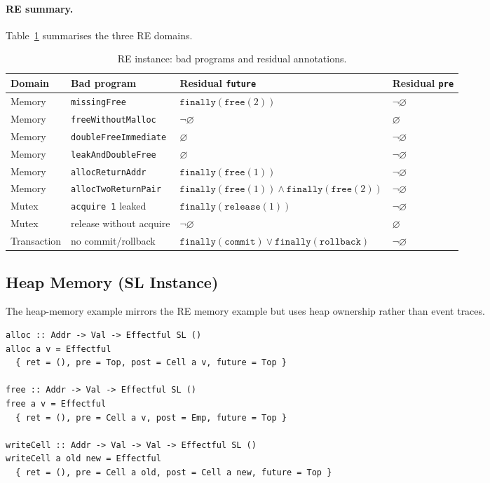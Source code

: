 \documentclass[acmsmall,screen]{acmart}
\newcommand{\finally}[1]{\mathtt{finally}(#1)}
\newcommand{\univ}{\neg\varnothing}
\begin{document}
\paragraph{RE summary.}
Table~\ref{tab:examples-re} summarises the three RE domains.

\begin{table}[h]
\caption{RE instance: bad programs and residual annotations.}
\label{tab:examples-re}
\begin{tabular}{llll}
\toprule
Domain & Bad program & Residual \lstinline{future} & Residual \lstinline{pre} \\
\midrule
Memory      & \lstinline{missingFree}           & $\finally{\mathtt{free}(2)}$ & $\univ$ \\
Memory      & \lstinline{freeWithoutMalloc}     & $\univ$ & $\varnothing$ \\
Memory      & \lstinline{doubleFreeImmediate}   & $\varnothing$ & $\univ$ \\
Memory      & \lstinline{leakAndDoubleFree}     & $\varnothing$ & $\univ$ \\
Memory      & \lstinline{allocReturnAddr}       & $\finally{\mathtt{free}(1)}$ & $\univ$ \\
Memory      & \lstinline{allocTwoReturnPair}    & $\finally{\mathtt{free}(1)}\wedge\finally{\mathtt{free}(2)}$ & $\univ$ \\
Mutex       & \lstinline{acquire 1} leaked      & $\finally{\mathtt{release}(1)}$ & $\univ$ \\
Mutex       & release without acquire           & $\univ$ & $\varnothing$ \\
Transaction & no commit/rollback                & $\finally{\mathtt{commit}}\vee\finally{\mathtt{rollback}}$ & $\univ$ \\
\bottomrule
\end{tabular}
\end{table}

\subsection{Heap Memory (SL Instance)}
\label{sec:ex-heap}

The heap-memory example mirrors the RE memory example but uses heap
ownership rather than event traces.

\begin{lstlisting}
alloc :: Addr -> Val -> Effectful SL ()
alloc a v = Effectful
  { ret = (), pre = Top, post = Cell a v, future = Top }

free :: Addr -> Val -> Effectful SL ()
free a v = Effectful
  { ret = (), pre = Cell a v, post = Emp, future = Top }

writeCell :: Addr -> Val -> Val -> Effectful SL ()
writeCell a old new = Effectful
  { ret = (), pre = Cell a old, post = Cell a new, future = Top }
\end{lstlisting}
\end{document}
